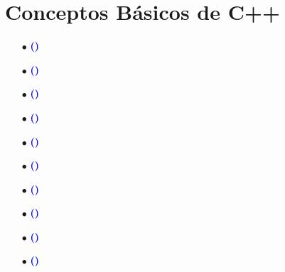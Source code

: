 \documentclass[12pt]{article}
\begin{document}
\section{Conceptos Básicos de C++}
{
    
    \begin{enumerate}
        \item[$\bullet$]\textbf{\textcolor{blue}{()}  }{}
        
        \item[$\bullet$]\textbf{\textcolor{blue}{()}  }{}
        
        \item[$\bullet$]\textbf{\textcolor{blue}{()}  }{}
        
        \item[$\bullet$]\textbf{\textcolor{blue}{()}  }{}
        
        \item[$\bullet$]\textbf{\textcolor{blue}{()}  }{}
        
        \item[$\bullet$]\textbf{\textcolor{blue}{()}  }{}
        
        \item[$\bullet$]\textbf{\textcolor{blue}{()}  }{}
        
        \item[$\bullet$]\textbf{\textcolor{blue}{()}  }{}
        
        \item[$\bullet$]\textbf{\textcolor{blue}{()}  }{}
        
        \item[$\bullet$]\textbf{\textcolor{blue}{()}  }{}
    \end{enumerate}
    
}
\end{document}
